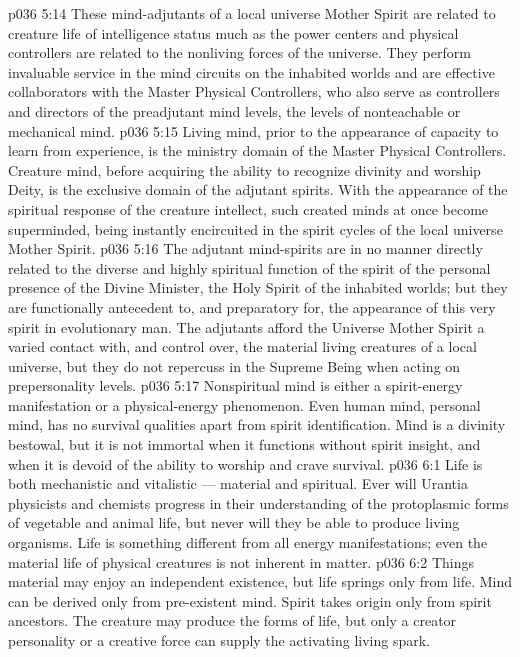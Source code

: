 \vs p036 5:14 These mind\hyp{}adjutants of a local universe Mother Spirit are related to creature life of intelligence status much as the power centers and physical controllers are related to the nonliving forces of the universe. They perform invaluable service in the mind circuits on the inhabited worlds and are effective collaborators with the Master Physical Controllers, who also serve as controllers and directors of the preadjutant mind levels, the levels of nonteachable or mechanical mind.
\vs p036 5:15 Living mind, prior to the appearance of capacity to learn from experience, is the ministry domain of the Master Physical Controllers. Creature mind, before acquiring the ability to recognize divinity and worship Deity, is the exclusive domain of the adjutant spirits. With the appearance of the spiritual response of the creature intellect, such created minds at once become superminded, being instantly encircuited in the spirit cycles of the local universe Mother Spirit.
\vs p036 5:16 The adjutant mind\hyp{}spirits are in no manner directly related to the diverse and highly spiritual function of the spirit of the personal presence of the Divine Minister, the Holy Spirit of the inhabited worlds; but they are functionally antecedent to, and preparatory for, the appearance of this very spirit in evolutionary man. The adjutants afford the Universe Mother Spirit a varied contact with, and control over, the material living creatures of a local universe, but they do not repercuss in the Supreme Being when acting on prepersonality levels.
\vs p036 5:17 \pc Nonspiritual mind is either a spirit\hyp{}energy manifestation or a physical\hyp{}energy phenomenon. Even human mind, personal mind, has no survival qualities apart from spirit identification. Mind is a divinity bestowal, but it is not immortal when it functions without spirit insight, and when it is devoid of the ability to worship and crave survival.
\vs p036 6:1 Life is both mechanistic and vitalistic --- material and spiritual. Ever will Urantia physicists and chemists progress in their understanding of the protoplasmic forms of vegetable and animal life, but never will they be able to produce living organisms. Life is something different from all energy manifestations; even the material life of physical creatures is not inherent in matter.
\vs p036 6:2 Things material may enjoy an independent existence, but life springs only from life. Mind can be derived only from pre\hyp{}existent mind. Spirit takes origin only from spirit ancestors. The creature may produce the forms of life, but only a creator personality or a creative force can supply the activating living spark.
